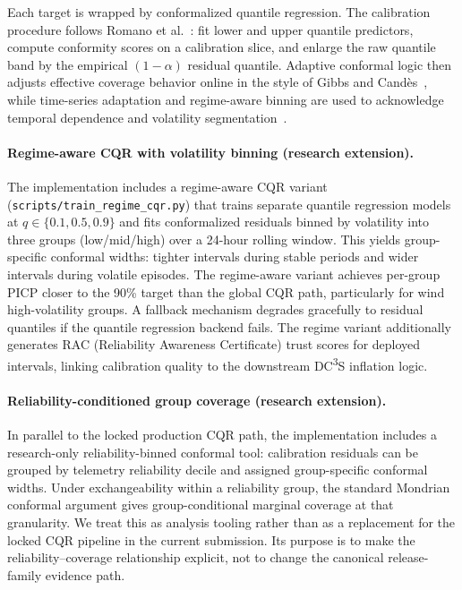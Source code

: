 \documentclass[11pt,a4paper]{article}
\begin{document}
Each target is wrapped by conformalized quantile regression. The calibration procedure follows Romano et al.~\cite{romano2019conformalized}: fit lower and upper quantile predictors, compute conformity scores on a calibration slice, and enlarge the raw quantile band by the empirical $(1-\alpha)$ residual quantile. Adaptive conformal logic then adjusts effective coverage behavior online in the style of Gibbs and Cand\`{e}s~\cite{gibbs2021adaptive}, while time-series adaptation and regime-aware binning are used to acknowledge temporal dependence and volatility segmentation~\cite{zaffran2022adaptive,barber2023conformal}.

\paragraph{Regime-aware CQR with volatility binning (research extension).}
The implementation includes a regime-aware CQR variant (\texttt{scripts/train\_regime\_cqr.py}) that trains separate quantile regression models at $q \in \{0.1, 0.5, 0.9\}$ and fits conformalized residuals binned by volatility into three groups (low/mid/high) over a 24-hour rolling window. This yields group-specific conformal widths: tighter intervals during stable periods and wider intervals during volatile episodes. The regime-aware variant achieves per-group PICP closer to the 90\% target than the global CQR path, particularly for wind high-volatility groups. A fallback mechanism degrades gracefully to residual quantiles if the quantile regression backend fails. The regime variant additionally generates RAC (Reliability Awareness Certificate) trust scores for deployed intervals, linking calibration quality to the downstream DC\textsuperscript{3}S inflation logic.

\paragraph{Reliability-conditioned group coverage (research extension).}
In parallel to the locked production CQR path, the implementation includes a research-only reliability-binned conformal tool: calibration residuals can be grouped by telemetry reliability decile and assigned group-specific conformal widths. Under exchangeability within a reliability group, the standard Mondrian conformal argument gives group-conditional marginal coverage at that granularity. We treat this as analysis tooling rather than as a replacement for the locked CQR pipeline in the current submission. Its purpose is to make the reliability--coverage relationship explicit, not to change the canonical release-family evidence path.
\end{document}
